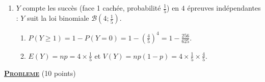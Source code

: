 \begin{enumerate}
\begin{enumerate}
\begin{itemize}
				\end{itemize}
			\end{enumerate}
		\item $Y$ compte les succès (face 1 cachée, probabilité $\frac{1}{5}$) en $4$ épreuves indépendantes :
			$Y$ suit la loi binomiale $\mathscr{B}\left(4;\frac{1}{5}\right)$.
			\begin{enumerate}
				\item {}
					$P(Y \geq 1) = 1 - P(Y = 0) = 1 - \left(\frac{4}{5}\right)^4 = 1 - \frac{256}{625}$.

				\item {} $E(Y) = np = 4\times\frac{1}{5}$ et $V(Y) = np(1-p) = 4\times\frac{1}{5}\times\frac{4}{5}$.

			\end{enumerate}
	\end{enumerate}
\noindent \underline{\textsc{\textbf{Probleme}}} (10 points)
